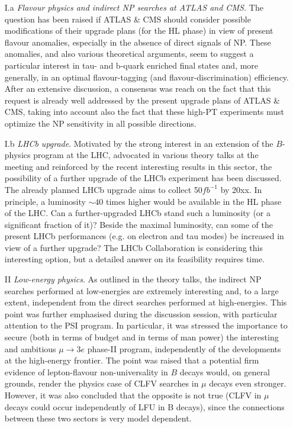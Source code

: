 \begin{enumerate}
\item[I.a] {\em Flavour physics and indirect NP searches at ATLAS and CMS.} 
The question has been raised if ATLAS \& CMS should consider possible 
modifications of their upgrade plans (for the HL phase) in view of present flavour anomalies,
especially in the absence of direct signals of NP. These anomalies, and also various theoretical 
arguments, seem to suggest a particular interest in tau- and b-quark enriched final states
and, more generally, in an optimal flavour-tagging (and flavour-discrimination) efficiency. 
After an extensive discussion, a consensus was reach on the fact that this request
is already well addressed by the present upgrade plans of ATLAS \& CMS,
taking into account also the fact that these high-PT experiments 
must optimize the NP sensitivity in all possible directions.

\item[I.b] {\em  LHCb upgrade}. 
Motivated by the strong interest in an extension of the $B$-physics program at the LHC,
advocated in various theory talks at the meeting and reinforced by the recent interesting results in this sector, 
the possibility of a further upgrade of the LHCb experiment  has been discussed.
The already planned LHCb upgrade aims to collect 50$fb^{-1}$ by 20xx.
In principle, a luminosity $\sim 40$ times higher would be available in the HL phase of the 
LHC. Can a further-upgraded LHCb stand such a luminosity (or a significant fraction of it)? 
Beside the maximal luminosity,  can some of the present LHCb performances (e.g. on electron and tau modes) 
be increased in view of a further upgrade? 
The LHCb Collaboration is considering this interesting option, but a detailed answer on its feasibility requires time.


\item[II] {\em Low-energy physics}. As outlined in the theory talks, the indirect NP searches performed at low-energies 
are extremely interesting and, to a large extent, independent from the direct searches performed at high-energies. 
This point was further emphasised during the discussion session, with particular attention to the PSI program. 
In particular, it was stressed the importance to secure (both in terms of budget and in terms of man power) 
the interesting and ambitious  $\mu \to 3 e$ phase-II program, independently of the developments 
at the high-energy frontier. The point was raised that a potential firm evidence of lepton-flavour non-universality
in $B$ decays would, on general grounds, render the physics case of  CLFV searches 
in $\mu$ decays even stronger.  However, it was also concluded that the opposite is not true 
(CLFV in  $\mu$  decays could occur independently of LFU in B decays), since the connections between these 
two sectors is very model dependent.



\end{enumerate}
